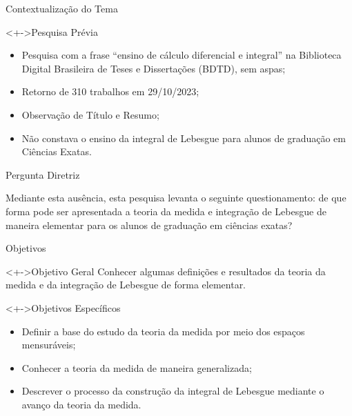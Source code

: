	\begin{frame}{Contextualização do Tema} %
		\begin{block}<+->{Pesquisa Prévia}
			\justify
			\begin{itemize}[<+->]
				\item Pesquisa com a frase “ensino de cálculo diferencial e integral” na
				Biblioteca Digital Brasileira de Teses e Dissertações (BDTD), sem aspas;
				\item Retorno de 310 trabalhos em 29/10/2023;
				\item Observação de Título e Resumo;
				\item Não constava o ensino da integral de Lebesgue para alunos de graduação em Ciências Exatas.
			\end{itemize}
		\end{block}
	\end{frame} %
	
	\begin{frame}{Pergunta Diretriz} %
		\begin{block}{}
			\justify
			Mediante esta ausência, esta pesquisa levanta o seguinte questionamento: de que
			forma pode ser apresentada a teoria da medida e integração de Lebesgue de maneira elementar
			para os alunos de graduação em ciências exatas?
		\end{block}
	\end{frame} %

	\begin{frame}{Objetivos} %
		\begin{block}<+->{Objetivo Geral}
			\justify
			Conhecer algumas definições e resultados da teoria da medida e da integração de Lebesgue de forma elementar.
		\end{block}
		\begin{block}<+->{Objetivos Específicos}
			\justify
			 \begin{itemize}[<+->]
				\item Definir a base do estudo da teoria da medida por meio dos espaços mensuráveis;
				\item Conhecer a teoria da medida de maneira generalizada;
				\item Descrever o processo da construção da integral de Lebesgue mediante o avanço da teoria da medida.
			\end{itemize}
		\end{block}
	\end{frame} %

